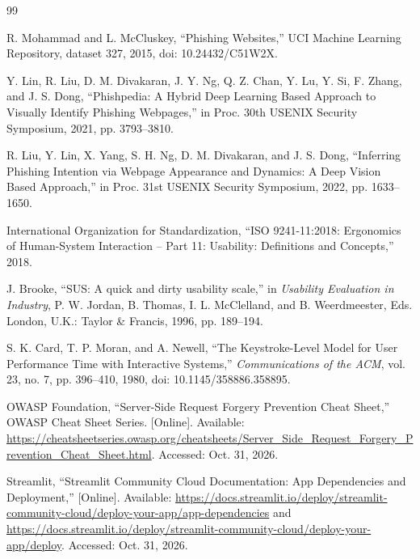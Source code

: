 \documentclass[conference]{IEEEtran}
\begin{document}
\balance
\begin{thebibliography}{99}

R. Mohammad and L. McCluskey, ``Phishing Websites,'' UCI Machine Learning Repository, dataset 327, 2015, doi: 10.24432/C51W2X.

Y. Lin, R. Liu, D. M. Divakaran, J. Y. Ng, Q. Z. Chan, Y. Lu, Y. Si, F. Zhang, and J. S. Dong, ``Phishpedia: A Hybrid Deep Learning Based Approach to Visually Identify Phishing Webpages,'' in Proc. 30th USENIX Security Symposium, 2021, pp. 3793--3810.

R. Liu, Y. Lin, X. Yang, S. H. Ng, D. M. Divakaran, and J. S. Dong, ``Inferring Phishing Intention via Webpage Appearance and Dynamics: A Deep Vision Based Approach,'' in Proc. 31st USENIX Security Symposium, 2022, pp. 1633--1650.

International Organization for Standardization, ``ISO 9241-11:2018: Ergonomics of Human-System Interaction -- Part 11: Usability: Definitions and Concepts,'' 2018.

J. Brooke, ``SUS: A quick and dirty usability scale,'' in \emph{Usability Evaluation in Industry}, P. W. Jordan, B. Thomas, I. L. McClelland, and B. Weerdmeester, Eds. London, U.K.: Taylor \& Francis, 1996, pp. 189--194.

S. K. Card, T. P. Moran, and A. Newell, ``The Keystroke-Level Model for User Performance Time with Interactive Systems,'' \emph{Communications of the ACM}, vol. 23, no. 7, pp. 396--410, 1980, doi: 10.1145/358886.358895.

OWASP Foundation, ``Server-Side Request Forgery Prevention Cheat Sheet,'' OWASP Cheat Sheet Series. [Online]. Available: \url{https://cheatsheetseries.owasp.org/cheatsheets/Server_Side_Request_Forgery_Prevention_Cheat_Sheet.html}. Accessed: Oct. 31, 2026.

Streamlit, ``Streamlit Community Cloud Documentation: App Dependencies and Deployment,'' [Online]. Available: \url{https://docs.streamlit.io/deploy/streamlit-community-cloud/deploy-your-app/app-dependencies} and \url{https://docs.streamlit.io/deploy/streamlit-community-cloud/deploy-your-app/deploy}. Accessed: Oct. 31, 2026.

\end{thebibliography}
\end{document}
